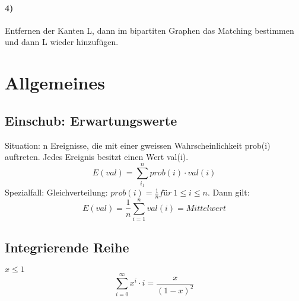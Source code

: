\paragraph{4)} Entfernen der Kanten L, dann im bipartiten Graphen das Matching bestimmen und dann L wieder hinzufügen.




\section{Allgemeines}
\subsection{Einschub: Erwartungswerte}
Situation: n Ereignisse, die mit einer gweissen Wahrscheinlichkeit prob(i) auftreten. Jedes Ereignis besitzt einen Wert val(i). 
$$E(val) = \sum_{i_1}^{n} prob(i)\cdot val(i) $$
Spezialfall: Gleichverteilung: $ prob(i)=\frac{1}{n} für\ 1\leq i \leq n $. Dann gilt:
$$ E(val)= \frac{1}{n} \sum_{i=1}^{n}val(i) = Mittelwert $$

\subsection{Integrierende Reihe}
$ x \leq 1 $
$$ \sum_{i=0}^\infty x^i \cdot i = \frac{x}{(1-x)^2}$$




